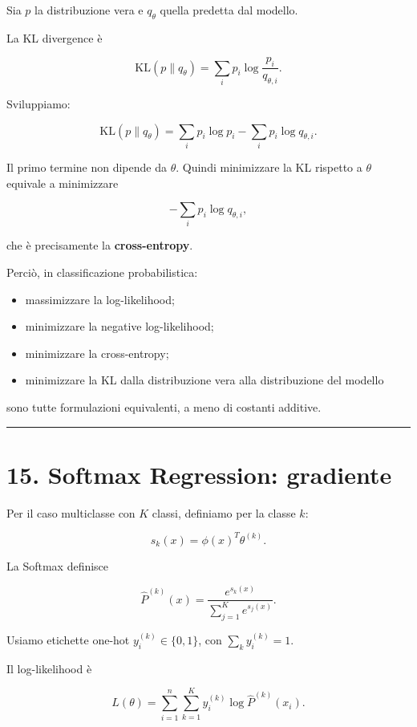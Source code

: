 \documentclass[
]{article}
\providecommand{\tightlist}{%
  \setlength{\itemsep}{0pt}\setlength{\parskip}{0pt}}
\begin{document}
Sia \(p\) la distribuzione vera e \(q_\theta\) quella predetta dal
modello.

La KL divergence è

\[
\mathrm{KL}(p\|q_\theta)=\sum_i p_i \log\frac{p_i}{q_{\theta,i}}.
\]

Sviluppiamo:

\[
\mathrm{KL}(p\|q_\theta)
=
\sum_i p_i\log p_i - \sum_i p_i\log q_{\theta,i}.
\]

Il primo termine non dipende da \(\theta\). Quindi minimizzare la KL
rispetto a \(\theta\) equivale a minimizzare

\[
-\sum_i p_i\log q_{\theta,i},
\]

che è precisamente la \textbf{cross-entropy}.

Perciò, in classificazione probabilistica:

\begin{itemize}
\tightlist
\item
  massimizzare la log-likelihood;
\item
  minimizzare la negative log-likelihood;
\item
  minimizzare la cross-entropy;
\item
  minimizzare la KL dalla distribuzione vera alla distribuzione del
  modello
\end{itemize}

sono tutte formulazioni equivalenti, a meno di costanti additive.

\begin{center}\rule{0.5\linewidth}{0.5pt}\end{center}

\section{15. Softmax Regression:
gradiente}\label{softmax-regression-gradiente}

Per il caso multiclasse con \(K\) classi, definiamo per la classe \(k\):

\[
s_k(x)=\phi(x)^T\theta^{(k)}.
\]

La Softmax definisce

\[
\hat P^{(k)}(x)
=
\frac{e^{s_k(x)}}{\sum_{j=1}^K e^{s_j(x)}}.
\]

Usiamo etichette one-hot \(y_i^{(k)}\in\{0,1\}\), con
\(\sum_k y_i^{(k)}=1\).

Il log-likelihood è

\[
L(\theta)
=
\sum_{i=1}^n\sum_{k=1}^K y_i^{(k)}\log \hat P^{(k)}(x_i).
\]
\end{document}

